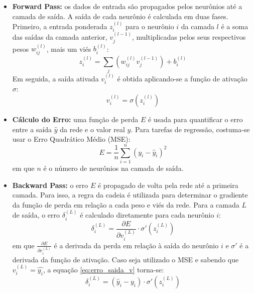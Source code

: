 \newpage
\begin{itemize}
\item \textbf{Forward Pass:} os dados de entrada são propagados pelos neurônios até a camada de saída. A saída de cada 
neurônio é calculada em duas fases. Primeiro, a entrada ponderada $ z_i^{(l)} $ para o neurônio $ i $ da camada
$ l $ é a soma das saídas da camada anterior, $ v_j^{(l-1)} $, multiplicadas pelos seus respectivos pesos $ w_{ij}^{(l)} $, 
mais um viés $ b_i^{(l)} $:
\begin{equation}
\label{eq:soma_ponderada_u}
z_i^{(l)} = \sum_{j} (w_{ij}^{(l)} v_j^{(l-1)}) + b_i^{(l)}
\end{equation}
Em seguida, a saída ativada $ v_i^{(l)} $ é obtida aplicando-se a função de ativação $ \sigma $:
\begin{equation}
\label{eq:ativacao_v}
v_i^{(l)} = \sigma(z_i^{(l)})
\end{equation}

\item \textbf{Cálculo do Erro:} uma função de perda $ E $ é usada para quantificar o erro entre a saída $ \hat{y} $ da 
rede e o valor real $ y $. Para tarefas de regressão, costuma-se usar o Erro Quadrático Médio (MSE):
\begin{equation}
\label{eq:mse_v}
E = \frac{1}{n} \sum_{i=1}^{n} (y_{i} - \hat{y}_i)^2
\end{equation}
em que $ n $ é o número de neurônios na camada de saída.

\item \textbf{Backward Pass:} o erro $ E $ é propagado de volta pela rede até a primeira camada. Para isso, a regra da cadeia 
é utilizada para determinar o gradiente da função de perda em relação a cada peso e viés da rede. Para a camada $ L $ de saída, 
o erro $ \delta_i^{(L)} $ é calculado diretamente para cada neurônio $ i $:
\begin{equation}
\label{eq:erro_saida_v}
\delta_i^{(L)} = \frac{\partial E}{\partial v_i^{(L)}} \cdot \sigma'(z_i^{(L)})
\end{equation}
em que $\frac{\partial E}{\partial v_i^{(L)}}$ é a derivada da perda em relação à saída do neurônio $i$ e $\sigma'$ é a 
derivada da função de ativação. Caso seja utilizado o MSE e sabendo que $ v_i^{(L)} = \hat{y_i} $, a equação 
\ref{eq:erro_saida_v} torna-se:
\begin{equation}
\label{eq:erro_saida_mse_v}
\delta_i^{(L)} = (\hat{y}_i - y_i) \cdot \sigma'(z_i^{(L)})
\end{equation}


\end{itemize}
